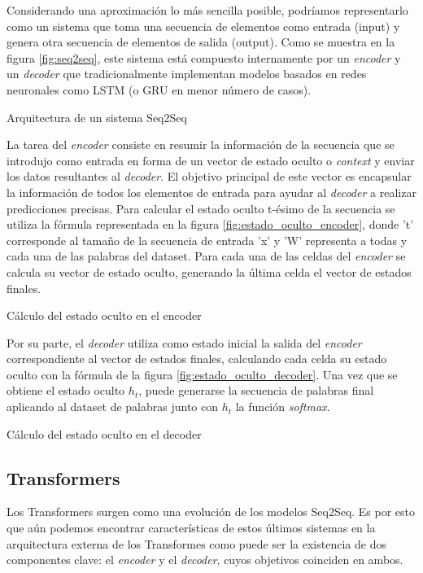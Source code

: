 Considerando una aproximación lo más sencilla posible, podríamos representarlo como un sistema que toma una secuencia de elementos como entrada (input) y genera otra secuencia de elementos de salida (output). Como se muestra en la figura \ref{fig:seq2seq}, este sistema está compuesto internamente por un \textit{encoder} y un \textit{decoder} que tradicionalmente implementan modelos basados en redes neuronales como LSTM (o GRU en menor número de casos). 

%
{Arquitectura de un sistema Seq2Seq}

La tarea del \textit{encoder} consiste en resumir la información de la secuencia que se introdujo como entrada en forma de un vector de estado oculto o \textit{context} y enviar los datos resultantes al \textit{decoder}. El objetivo principal de este vector es encapsular la información de todos los elementos de entrada para ayudar al \textit{decoder} a realizar predicciones precisas. Para calcular el estado oculto t-ésimo de la secuencia se utiliza la fórmula representada en la figura \ref{fig:estado_oculto_encoder}, donde 't' corresponde al tamaño de la secuencia de entrada 'x' y 'W' representa a todas y cada una de las palabras del dataset. Para cada una de las celdas del \textit{encoder} se calcula su vector de estado oculto, generando la última celda el vector de estados finales.

%
{Cálculo del estado oculto en el encoder}

Por su parte, el \textit{decoder} utiliza como estado inicial la salida del \textit{encoder} correspondiente al vector de estados finales, calculando cada celda su estado oculto con la fórmula de la figura \ref{fig:estado_oculto_decoder}. Una vez que se obtiene el estado oculto $h_{t}$, puede generarse la secuencia de palabras final aplicando al dataset de palabras junto con $h_{t}$ la función \textit{softmax}.

%
{Cálculo del estado oculto en el decoder}



\subsection{Transformers}
Los Transformers surgen como una evolución de los modelos Seq2Seq. Es por esto que aún podemos encontrar características de estos últimos sistemas en la arquitectura externa de los Transformes como puede ser la existencia de dos componentes clave: el \textit{encoder} y el \textit{decoder}, cuyos objetivos coinciden en ambos.


